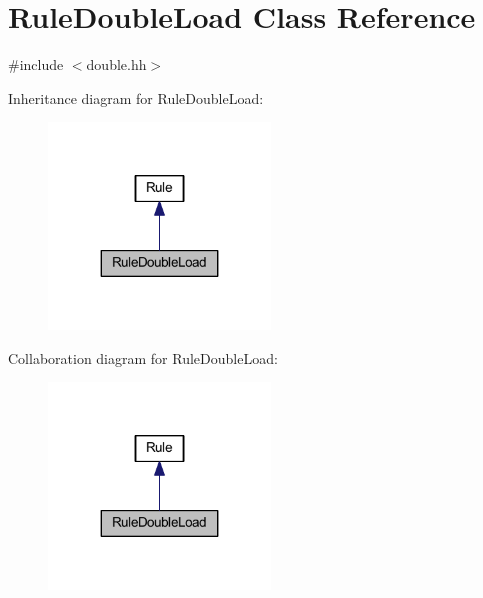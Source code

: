 \hypertarget{class_rule_double_load}{}\section{Rule\+Double\+Load Class Reference}
\label{class_rule_double_load}


{\ttfamily \#include $<$double.\+hh$>$}



Inheritance diagram for Rule\+Double\+Load\+:
\nopagebreak
\begin{figure}[H]
\begin{center}
\leavevmode
\includegraphics[width=167pt]{class_rule_double_load__inherit__graph}
\end{center}
\end{figure}


Collaboration diagram for Rule\+Double\+Load\+:
\nopagebreak
\begin{figure}[H]
\begin{center}
\leavevmode
\includegraphics[width=167pt]{class_rule_double_load__coll__graph}
\end{center}
\end{figure}
